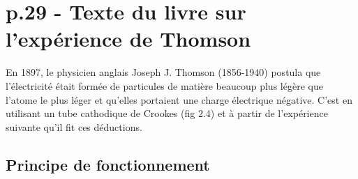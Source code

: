 \documentclass[../main.tex]{subfiles}
\begin{document}
\section{p.29 - Texte du livre sur l'expérience de Thomson}

En 1897, le physicien anglais Joseph J. Thomson (1856-1940) postula que l'électricité était formée de particules de matière beaucoup plus légère que l'atome le plus léger et qu'elles portaient une charge électrique négative. C'est en utilisant un tube cathodique de Crookes (fig 2.4) et à partir de l'expérience suivante qu'il fit ces déductions.\\
\subsection{Principe de fonctionnement}
\end{document}
